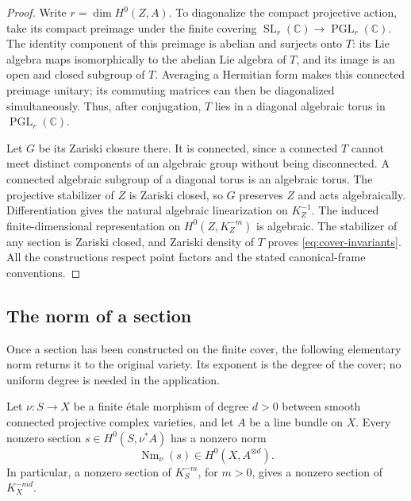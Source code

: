 \begin{proof}
Write $r=\dim H^0(Z,A)$.  To diagonalize the compact projective
action, take its compact preimage under the finite covering
$\operatorname{SL}_r(\mathbb C)\to\operatorname{PGL}_r(\mathbb C)$.
The identity component of this preimage is abelian and surjects onto
$T$: its Lie algebra maps isomorphically to the abelian Lie algebra
of $T$, and its image is an open and closed subgroup of $T$.
Averaging a Hermitian form makes this connected preimage unitary;
its commuting matrices can then be diagonalized simultaneously.
Thus, after conjugation, $T$ lies in a diagonal algebraic torus in
$\operatorname{PGL}_r(\mathbb C)$.

Let $G$ be its Zariski closure there.  It is connected, since a
connected $T$ cannot meet distinct components of an algebraic group
without being disconnected.  A connected algebraic subgroup of a
diagonal torus is an algebraic torus.  The projective stabilizer of
$Z$ is Zariski closed, so $G$ preserves $Z$ and acts algebraically.
Differentiation gives the natural algebraic linearization on
$K_Z^{-1}$.  The induced finite-dimensional representation on
$H^0(Z,K_Z^{-m})$ is algebraic.  The stabilizer of any section is
Zariski closed, and Zariski density of $T$ proves
\eqref{eq:cover-invariants}.  All the constructions respect point
factors and the stated canonical-frame conventions.
\end{proof}

\subsection{The norm of a section}

Once a section has been constructed on the finite cover, the following
elementary norm returns it to the original variety.  Its exponent is
the degree of the cover; no uniform degree is needed in the application.

\begin{lemma}
\label{lem:etale-norm}
Let $\nu:S\to X$ be a finite \'etale morphism of degree $d>0$
between smooth connected projective complex varieties, and let $A$ be
a line bundle on $X$.  Every nonzero section
$s\in H^0(S,\nu^*A)$ has a nonzero norm
\[
                    \operatorname{Nm}_{\nu}(s)
                    \in H^0(X,A^{\otimes d}).
\]
In particular, a nonzero section of $K_S^{-m}$, for $m>0$, gives a
nonzero section of $K_X^{-md}$.
\end{lemma}

